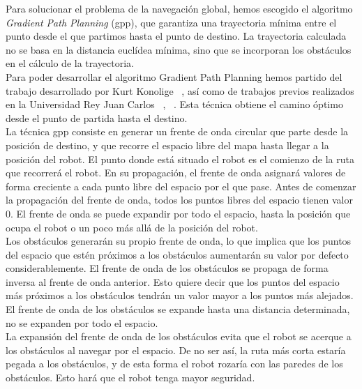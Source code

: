 Para solucionar el problema de la navegación global, hemos escogido el algoritmo \textit{Gradient Path Planning} (\acrshort{gpp}), que garantiza una trayectoria mínima entre el punto desde el que partimos hasta el punto de destino. La trayectoria calculada no se basa en la distancia euclídea mínima, sino que se incorporan los obstáculos en el cálculo de la trayectoria.\\

Para poder desarrollar el algoritmo Gradient Path Planning hemos partido del trabajo desarrollado por Kurt Konolige  ~\cite{gradient}, así como de trabajos previos realizados en la Universidad Rey Juan Carlos ~\cite{navegacion_autolocalizacion3}, ~\cite{navegacion_autolocalizacion4}. Esta técnica obtiene el camino óptimo desde el punto de partida hasta el destino.\\

La técnica \acrshort{gpp} consiste en generar un frente de onda circular que parte desde la posición de destino, y que recorre el espacio libre del mapa hasta llegar a la posición del robot. El punto donde está situado el robot es el comienzo de la ruta que recorrerá el robot. En su propagación, el frente de onda asignará valores de forma creciente a cada punto libre del espacio por el que pase. Antes de comenzar la propagación del frente de onda, todos los puntos libres del espacio tienen valor 0. El frente de onda se puede expandir por todo el espacio, hasta la posición que ocupa el robot o un poco más allá de la posición del robot.\\

Los obstáculos generarán su propio frente de onda, lo que implica que los puntos del espacio que estén próximos a los obstáculos aumentarán su valor por defecto considerablemente. El frente de onda de los obstáculos se propaga de forma inversa al frente de onda anterior. Esto quiere decir que los puntos del espacio más próximos a los obstáculos tendrán un valor mayor a los puntos más alejados. El frente de onda de los obstáculos se expande hasta una distancia determinada, no se expanden por todo el espacio.\\

La expansión del frente de onda de los obstáculos evita que el robot se acerque a los obstáculos al navegar por el espacio. De no ser así, la ruta más corta estaría pegada a los obstáculos, y de esta forma el robot rozaría con las paredes de los obstáculos. Esto hará que el robot tenga mayor seguridad.\\

